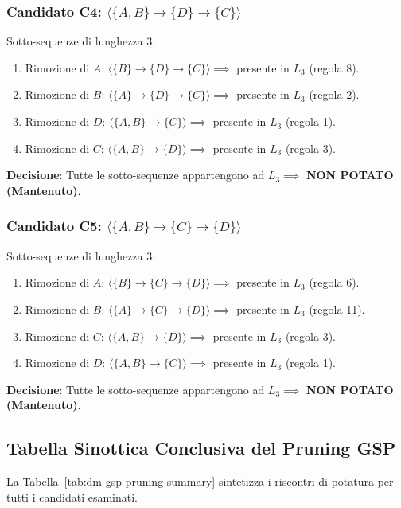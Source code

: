 \subsubsection{Candidato C4: \texorpdfstring{$\langle \{A, B\} \to \{D\} \to \{C\} \rangle$}{C4}}
Sotto-sequenze di lunghezza 3:
\begin{enumerate}
    \item Rimozione di $A$: $\langle \{B\} \to \{D\} \to \{C\} \rangle \implies$ presente in $L_3$ (regola 8).
    \item Rimozione di $B$: $\langle \{A\} \to \{D\} \to \{C\} \rangle \implies$ presente in $L_3$ (regola 2).
    \item Rimozione di $D$: $\langle \{A, B\} \to \{C\} \rangle \implies$ presente in $L_3$ (regola 1).
    \item Rimozione di $C$: $\langle \{A, B\} \to \{D\} \rangle \implies$ presente in $L_3$ (regola 3).
\end{enumerate}
\textbf{Decisione}: Tutte le sotto-sequenze appartengono ad $L_3 \implies$ \textbf{NON POTATO (Mantenuto)}.

\subsubsection{Candidato C5: \texorpdfstring{$\langle \{A, B\} \to \{C\} \to \{D\} \rangle$}{C5}}
Sotto-sequenze di lunghezza 3:
\begin{enumerate}
    \item Rimozione di $A$: $\langle \{B\} \to \{C\} \to \{D\} \rangle \implies$ presente in $L_3$ (regola 6).
    \item Rimozione di $B$: $\langle \{A\} \to \{C\} \to \{D\} \rangle \implies$ presente in $L_3$ (regola 11).
    \item Rimozione di $C$: $\langle \{A, B\} \to \{D\} \rangle \implies$ presente in $L_3$ (regola 3).
    \item Rimozione di $D$: $\langle \{A, B\} \to \{C\} \rangle \implies$ presente in $L_3$ (regola 1).
\end{enumerate}
\textbf{Decisione}: Tutte le sotto-sequenze appartengono ad $L_3 \implies$ \textbf{NON POTATO (Mantenuto)}.

\FloatBarrier
\subsection{Tabella Sinottica Conclusiva del Pruning GSP}
La Tabella~\ref{tab:dm-gsp-pruning-summary} sintetizza i riscontri di potatura per tutti i candidati esaminati.

